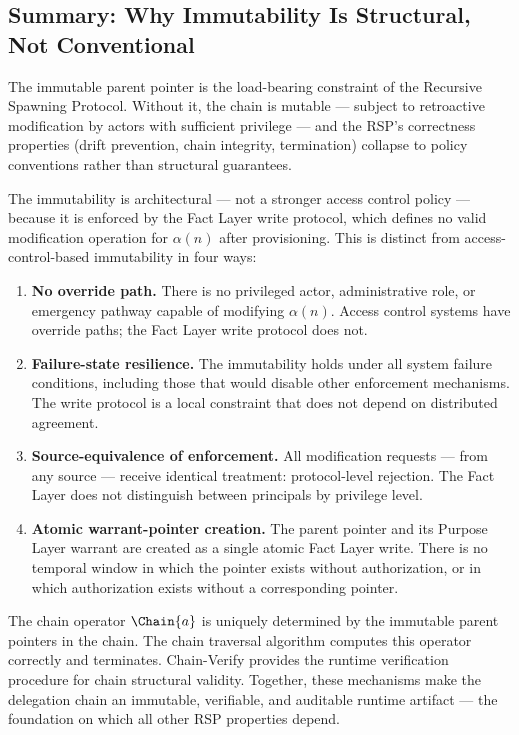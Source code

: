 \subsection{Summary: Why Immutability Is Structural, Not Conventional}
\label{sec:immutability-structural-summary}

The immutable parent pointer is the load-bearing constraint of the Recursive Spawning Protocol. Without it, the chain is mutable --- subject to retroactive modification by actors with sufficient privilege --- and the RSP's correctness properties (drift prevention, chain integrity, termination) collapse to policy conventions rather than structural guarantees.

The immutability is architectural --- not a stronger access control policy --- because it is enforced by the Fact Layer write protocol, which defines no valid modification operation for $\alpha(n)$ after provisioning. This is distinct from access-control-based immutability in four ways:

\begin{enumerate}
\item[(1)] \textbf{No override path.} There is no privileged actor, administrative role, or emergency pathway capable of modifying $\alpha(n)$. Access control systems have override paths; the Fact Layer write protocol does not.

\item[(2)] \textbf{Failure-state resilience.} The immutability holds under all system failure conditions, including those that would disable other enforcement mechanisms. The write protocol is a local constraint that does not depend on distributed agreement.

\item[(3)] \textbf{Source-equivalence of enforcement.} All modification requests --- from any source --- receive identical treatment: protocol-level rejection. The Fact Layer does not distinguish between principals by privilege level.

\item[(4)] \textbf{Atomic warrant-pointer creation.} The parent pointer and its Purpose Layer warrant are created as a single atomic Fact Layer write. There is no temporal window in which the pointer exists without authorization, or in which authorization exists without a corresponding pointer.
\end{enumerate}

The chain operator $\Chain{a}$ is uniquely determined by the immutable parent pointers in the chain. The chain traversal algorithm computes this operator correctly and terminates. Chain-Verify provides the runtime verification procedure for chain structural validity. Together, these mechanisms make the delegation chain an immutable, verifiable, and auditable runtime artifact --- the foundation on which all other RSP properties depend.
